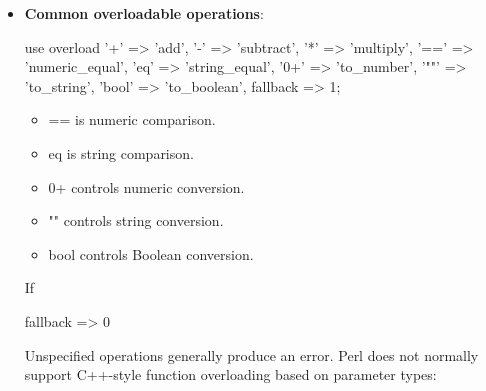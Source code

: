 \documentclass{report}
\begin{document}
\begin{itemize}
\begin{perlcode}
{                    return $self->{value} - $other;
                }
            \end{perlcode}
            \bigbreak \noindent 
            \begin{perlcode}
                $object - 5;
                5 - $object;
            \end{perlcode}
            \bigbreak \noindent 
            These expressions have different operand orders, so \$swapped helps distinguish them.
        \item \textbf{Common overloadable operations}: 
            \bigbreak \noindent 
            \begin{perlcode}
                use overload
                    '+'    => 'add',
                    '-'    => 'subtract',
                    '*'    => 'multiply',
                    '=='   => 'numeric_equal',
                    'eq'   => 'string_equal',
                    '0+'   => 'to_number',
                    '""'   => 'to_string',
                    'bool' => 'to_boolean',
                    fallback => 1;
            \end{perlcode}
            \begin{itemize}
                \item == is numeric comparison.
                \item eq is string comparison.
                \item 0+ controls numeric conversion.
                \item "" controls string conversion.
                \item bool controls Boolean conversion.
            \end{itemize}
            If 
            \bigbreak \noindent 
            \begin{perlcode}
            fallback => 0
            \end{perlcode}
            \bigbreak \noindent 
            Unspecified operations generally produce an error.
            \bigbreak \noindent 
            Perl does not normally support C++-style function overloading based on parameter types:

    \end{itemize}
\end{document}
